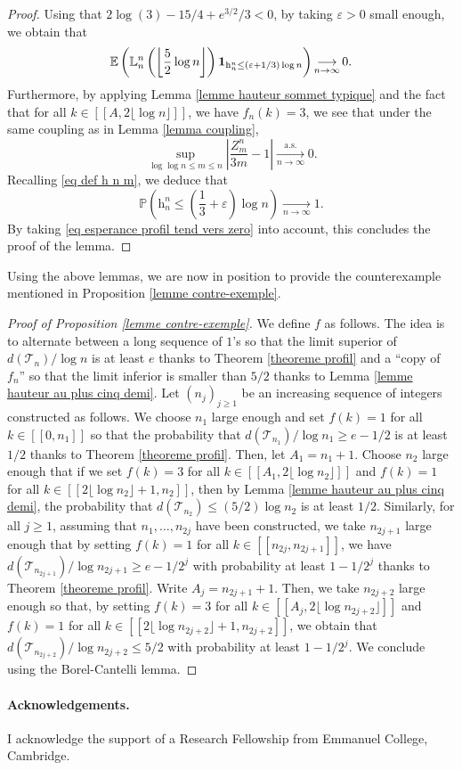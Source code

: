 \documentclass[11pt]{article}
\numberwithin{equation}{section}
\def\vp{\varepsilon}
\def \T{\mathcal{T}}
\def\E{\mathbb{E}}
\def\P{\mathbb{P}}
\def\lb{[\![}
\def\rb{]\!]}
\begin{document}
\begin{proof}
	Using that $2\log(3) -15/4 + e^{3/2}/3 <0$, by taking $\vp>0$ small enough, we obtain that
	\begin{equation}\label{eq esperance profil tend vers zero}
	\E\left( \mathbb{L}^n_n\left(\left\lfloor \frac{5}{2} \log n \right\rfloor\right)  {\bf 1}_{\mathrm{h}_n^n \le (\vp+1/3) \log n}\right)  \mathop{\longrightarrow}\limits_{n \to \infty} 0.
	\end{equation}
	Furthermore, by applying Lemma \ref{lemme hauteur sommet typique} and the fact that for all $k \in \lb A, 2 \lfloor \log n \rfloor\rb$, we have $f_n(k)=3$, we see that under the same coupling as in Lemma \ref{lemma coupling},
	\[
	\sup_{\log \log n \le m \le n} \left\vert \frac{Z^n_m}{3m} -1 \right\vert \mathop{\longrightarrow}\limits_{n \to \infty}^{\mathrm{a.s.}} 0.
	\]
	Recalling \eqref{eq def h n m}, we deduce that
	\[
	\P\left(\mathrm{h}_n^n \le \left( \frac{1}{3} +\vp\right)\log n \right) \mathop{\longrightarrow}\limits_{n\to \infty} 1.
	\]
	By taking \eqref{eq esperance profil tend vers zero} into account, this concludes the proof of the lemma.
\end{proof}
Using the above lemmas, we are now in position to provide the counterexample mentioned in Proposition \ref{lemme contre-exemple}.
\begin{proof}[Proof of Proposition \ref{lemme contre-exemple}]
	We define $f$ as follows. The idea is to alternate between a long sequence of $1$'s so that the limit superior of $d(\T_n)/\log n$ is at least $e$ thanks to Theorem \ref{theoreme profil} and a ``copy of $f_n$'' so that the limit inferior is smaller than $5/2$ thanks to Lemma \ref{lemme hauteur au plus cinq demi}. Let $(n_j)_{j\ge 1}$ be an increasing sequence of integers constructed as follows. We choose $n_1$ large enough and set $f(k)=1$ for all $k \in \lb 0, n_1 \rb$ so that the probability that $d(\T_{n_1})/\log n_1 \ge e-1/2$ is at least $1/2$ thanks to Theorem \ref{theoreme profil}. Then, let $A_1=n_1+1$. Choose $n_2$ large enough that if we set $f(k)=3$ for all $k \in \lb A_1, 2 \lfloor \log n_2 \rfloor \rb$ and $f(k)=1$ for all $k \in \lb 2 \lfloor \log n_2 \rfloor +1, n_2\rb$, then by Lemma \ref{lemme hauteur au plus cinq demi}, the probability that $d(\T_{n_2}) \le (5/2)\log n_2$ is at least $1/2$. Similarly, for all $j\ge 1$, assuming that $n_1, \ldots, n_{2j}$ have been constructed, we take $n_{2j+1}$ large enough that by setting $f(k)=1$ for all $k \in \lb n_{2j}, n_{2j+1} \rb$, we have $d(\T_{n_{2j+1}})/\log n_{2j+1} \ge e-1/2^{j}$ with probability at least $1-1/2^{j}$ thanks to Theorem \ref{theoreme profil}. Write $A_j=n_{2j+1}+1$. Then, we take $n_{2j+2}$ large enough so that, by setting $f(k)=3$ for all $k \in \lb A_j, 2 \lfloor \log n_{2j+2} \rfloor\rb$ and $f(k)=1$ for all $k \in  \lb 2 \lfloor \log n_{2j+2} \rfloor+1 , n_{2j+2} \rb$, we obtain that $d(\T_{n_{2j+2}})/\log n_{2j+2} \le 5/2$ with probability at least $1-1/2^j$. We conclude using the Borel-Cantelli lemma.
\end{proof}



\paragraph{Acknowledgements.} I acknowledge the support of a Research Fellowship from Emmanuel College, Cambridge.



\end{document}
